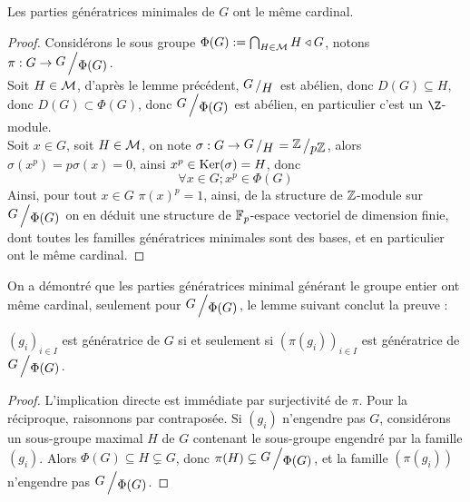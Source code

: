 \begin{thm}
	Les parties génératrices minimales de $G$ ont le même cardinal.
\end{thm}
\begin{proof}
	Considérons le sous groupe $\Phi(G) := \bigcap_{H\in \mathcal{M}} H \triangleleft G$, notons $\pi : G \to \bigslant{G}{\Phi(G)}$. \\
	Soit $ H\in \mathcal{M}$, d'après le lemme précédent, $\bigslant{G}{H}$ est abélien, donc $D(G) \subseteq H$, donc $D(G) \subset \Phi(G)$, donc $\bigslant{G}{\Phi(G)}$ est abélien, en particulier c'est un $\Z$-module. \\
	Soit $x\in G$, soit $H\in \mathcal{M}$, on note $\sigma : G \to \bigslant{G}{H} = \bigslant{\ZZ}{p\ZZ}$, alors $\sigma(x^p) = p \sigma(x) = 0$, ainsi $x^p \in \textup{Ker}(\sigma) = H$, donc
	\[ 
		\forall x \in G; x^p \in \Phi(G)
	\]
	Ainsi, pour tout $x \in G$ $\pi(x)^p = 1$, ainsi, de la structure de $\mathbb{Z}$-module sur $\bigslant{G}{\Phi(G)}$ on en déduit une structure de $\mathbb{F}_p$-espace vectoriel de dimension finie, dont toutes les familles génératrices minimales sont des bases, et en particulier ont le même cardinal.
\end{proof}

On a démontré que les parties génératrices minimal générant le groupe entier ont même cardinal, seulement pour $\bigslant{G}{\Phi(G)}$, le lemme suivant conclut la preuve :

\begin{lem}
	$(g_i)_{i\in I}$ est génératrice de $G$ si et seulement si $(\pi(g_i))_{i \in I}$ est génératrice de $\bigslant{G}{\Phi(G)}$.
\end{lem}
\begin{proof}
	L'implication directe est immédiate par surjectivité de $\pi$. Pour la réciproque, raisonnons par contraposée. Si $(g_i)$ n'engendre pas $G$, considérons un sous-groupe maximal $H$ de $G$ contenant le sous-groupe engendré par la famille $(g_i)$. Alors $\Phi(G) \subseteq H \subsetneq G$, donc $\pi(H) \subsetneq \bigslant{G}{\Phi(G)}$, et la famille $(\pi(g_i))$ n'engendre pas $\bigslant{G}{\Phi(G)}$.
\end{proof}




